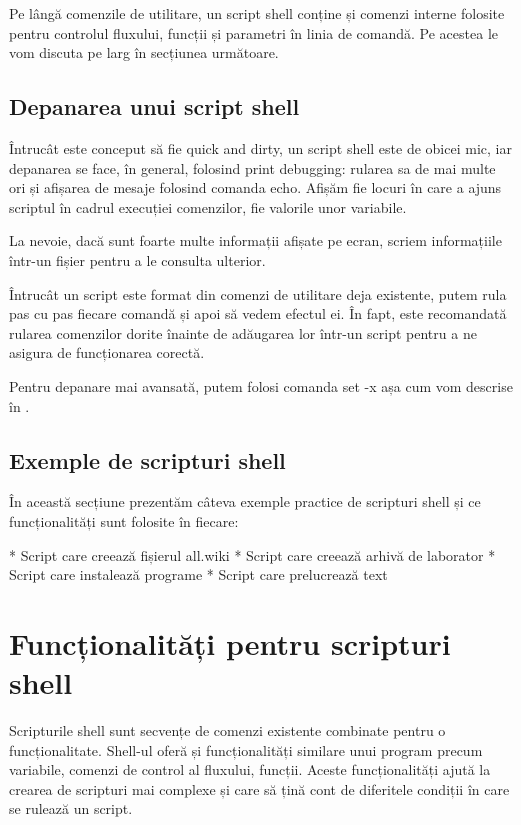 Pe lângă comenzile de utilitare, un script shell conține și comenzi interne
folosite pentru controlul fluxului, funcții și parametri în linia de comandă. Pe
acestea le vom discuta pe larg în secțiunea următoare.

\subsection{Depanarea unui script shell}
\label{sec:script-dev-debugging}

Întrucât este conceput să fie quick and dirty, un script shell este de obicei
mic, iar depanarea se face, în general, folosind print debugging: rularea sa de
mai multe ori și afișarea de mesaje folosind comanda echo. Afișăm fie locuri în
care a ajuns scriptul în cadrul execuției comenzilor, fie valorile unor
variabile.

La nevoie, dacă sunt foarte multe informații afișate pe ecran, scriem
informațiile într-un fișier pentru a le consulta ulterior.

Întrucât un script este format din comenzi de utilitare deja existente, putem
rula pas cu pas fiecare comandă și apoi să vedem efectul ei. În fapt, este
recomandată rularea comenzilor dorite înainte de adăugarea lor într-un script
pentru a ne asigura de funcționarea corectă.

Pentru depanare mai avansată, putem folosi comanda set -x așa cum vom descrise
în .

\subsection{Exemple de scripturi shell}
\label{sec:script-dev-ex}

În această secțiune prezentăm câteva exemple practice de scripturi shell și ce
funcționalități sunt folosite în fiecare:

* Script care creează fișierul all.wiki
* Script care creează arhivă de laborator
* Script care instalează programe
* Script care prelucrează text

\section{Funcționalități pentru scripturi shell}
\label{sec:script-func}

Scripturile shell sunt secvențe de comenzi existente combinate pentru o
funcționalitate. Shell-ul oferă și funcționalități similare unui program precum
variabile, comenzi de control al fluxului, funcții. Aceste funcționalități ajută
la crearea de scripturi mai complexe și care să țină cont de diferitele condiții
în care se rulează un script.


